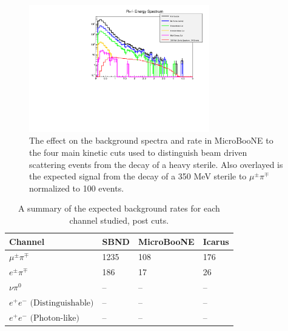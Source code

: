 \documentclass[11pt, a4paper]{article}
\begin{document}
\begin{figure}[t]
\center
\includegraphics[width=0.7\textwidth]{figures/cuts.pdf}
\caption{\label{fig:cuts} The effect on the background spectra and rate in MicroBooNE to the four main kinetic cuts used to distinguish beam driven scattering events from the decay of a heavy sterile. Also overlayed is the expected signal from the decay of a 350 MeV sterile to $\mu^\pm \pi^\mp$ normalized to 100 events.}
\end{figure}




\begin{table}[t]
\centering
\begin{tabular}{ l | l | l | l}
	Channel & SBND & MicroBooNE & Icarus \\
\hline\hline
\multirow{1}{*}{$\mu^\pm \pi^\mp$} & 1235 & 108 & 176 \\
\multirow{1}{*}{$ e^\pm \pi^\mp$}  & 186  & 17 & 26\\
\multirow{1}{*}{$ \nu \pi^0$}&  -- & -- & --\\
\multirow{1}{*}{$ e^+e^- \text{ (Distinguishable)} $} &  -- & -- & --\\
 \multirow{1}{*}{$ e^+ e^- \text{ (Photon-like)}$} & -- & -- & --\\
 \hline \hline

\end{tabular}
\caption{\label{tab:Rates_post_cuts} A summary of the expected background rates for each channel studied, post cuts. }
\end{table}
\end{document}
